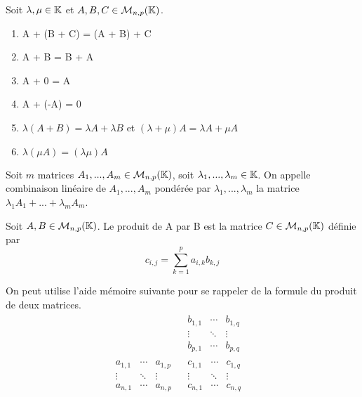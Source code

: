 \documentclass[a4paper, 12pt]{article}
\begin{document}
\begin{propriete}{}{}
    Soit $\lambda, \mu \in \mathbb{K}$ et $A, B, C \in \mathcal{M}_{n, p}(\mathbb{K})$.
    \begin{enumerate}
        \item A + (B + C) = (A + B) + C
        \item A + B = B + A
        \item A + 0 = A
        \item A + (-A) = 0
        \item $\lambda(A + B) = \lambda A + \lambda B$ et $(\lambda + \mu)A = \lambda A + \mu A$
        \item $\lambda(\mu A) = (\lambda \mu)A$
    \end{enumerate}
\end{propriete}

\begin{definition}
    Soit $m$ matrices $A_1, ..., A_m \in \mathcal{M}_{n, p}(\mathbb{K})$,
    soit $\lambda_1, ..., \lambda_m \in \mathbb{K}$.
    On appelle combinaison linéaire de $A_1, ..., A_m$ pondérée par $\lambda_1, ..., \lambda_m$ la matrice
    $\lambda_1 A_1 + ... + \lambda_m A_m$.
\end{definition}

\begin{definition}
    Soit $A, B \in \mathcal{M}_{n, p}(\mathbb{K})$.
    Le produit de A par B est la matrice $C \in \mathcal{M}_{n, p}(\mathbb{K})$ définie par
    $$
        c_{i, j} = \sum_{k = 1}^{p} a_{i, k} b_{k, j}
    $$
\end{definition}

\begin{remarque}
    On peut utilise l'aide mémoire suivante pour se rappeler de la formule du produit de deux matrices.
    $$
    \begin{array}{ccc}
        & \begin{matrix}
            b_{1, 1} & \cdots & b_{1, q} \\
            \vdots & \ddots & \vdots \\
            b_{p, 1} & \cdots & b_{p, q}
        \end{matrix} & \\
        \begin{matrix}
            a_{1, 1} & \cdots & a_{1, p} \\
            \vdots & \ddots & \vdots \\
            a_{n, 1} & \cdots & a_{n, p}
        \end{matrix} &
        \begin{matrix}
            c_{1, 1} & \cdots & c_{1, q} \\
            \vdots & \ddots & \vdots \\
            c_{n, 1} & \cdots & c_{n, q}
        \end{matrix} &
    \end{array}
    $$
\end{remarque}
\end{document}
